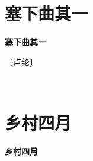 \documentclass[12pt,UTF-8,openany,fontset=none]{ctexbook}
\begin{document}
\vspace{8pt}
\clearpage

\section{塞下曲其一}



\begin{center}
    {\bfseries 塞下曲其一}
\end{center}

\begin{center}
    \vspace{10pt}
    
    \begin{large}
        
        〔卢纶〕
        
    \end{large}
    
    \vspace{8pt}
    
    \begin{huge}
        
        \phantom{。}

        \phantom{。}
        
        \phantom{。}~~

        \phantom{。}
        
    \end{huge}
    
\end{center}

\vspace{8pt}
\clearpage

\section{乡村四月}



\begin{center}
    {\bfseries 乡村四月}
\end{center}
\end{document}
